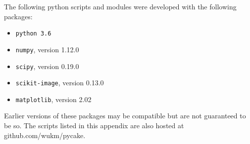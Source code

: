 
The following python scripts and modules were developed with the following packages:

\begin{itemize}
\item \texttt{python 3.6}
\item \texttt{numpy}, version 1.12.0
\item \texttt{scipy}, version 0.19.0
\item \texttt{scikit-image}, version 0.13.0 
\item \texttt{matplotlib}, version 2.02
\end{itemize}

Earlier versions of these packages may be compatible but are not guaranteed to be so. 
The scripts listed in this appendix are also hosted at github.com/wukm/pycake.












